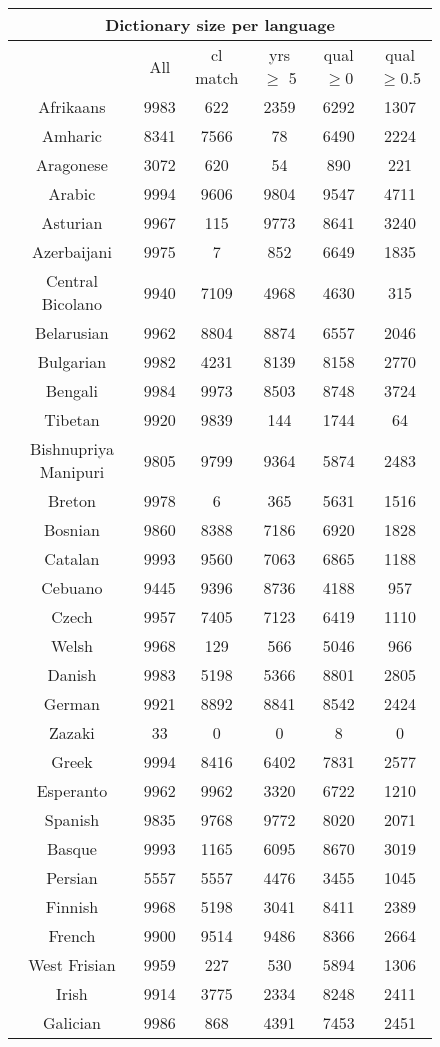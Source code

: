 \begin{figure}[h]
\centering
\begin{tabular}{cccccc}
\multicolumn{6}{c}{Dictionary size per language}\\
\hline\hline
&All&cl match&yrs $\geq$ 5&qual$\geq$0&qual$\geq$0.5\\
\hline\hline
Afrikaans&9983&622&2359&6292&1307\\
Amharic&8341&7566&78&6490&2224\\
Aragonese&3072&620&54&890&221\\
Arabic&9994&9606&9804&9547&4711\\
Asturian&9967&115&9773&8641&3240\\
Azerbaijani&9975&7&852&6649&1835\\
Central Bicolano&9940&7109&4968&4630&315\\
Belarusian&9962&8804&8874&6557&2046\\
Bulgarian&9982&4231&8139&8158&2770\\
Bengali&9984&9973&8503&8748&3724\\
Tibetan&9920&9839&144&1744&64\\
Bishnupriya Manipuri&9805&9799&9364&5874&2483\\
Breton&9978&6&365&5631&1516\\
Bosnian&9860&8388&7186&6920&1828\\
Catalan&9993&9560&7063&6865&1188\\
Cebuano&9445&9396&8736&4188&957\\
Czech&9957&7405&7123&6419&1110\\
Welsh&9968&129&566&5046&966\\
Danish&9983&5198&5366&8801&2805\\
German&9921&8892&8841&8542&2424\\
Zazaki&33&0&0&8&0\\
Greek&9994&8416&6402&7831&2577\\
Esperanto&9962&9962&3320&6722&1210\\
Spanish&9835&9768&9772&8020&2071\\
Basque&9993&1165&6095&8670&3019\\
Persian&5557&5557&4476&3455&1045\\
Finnish&9968&5198&3041&8411&2389\\
French&9900&9514&9486&8366&2664\\
West Frisian&9959&227&530&5894&1306\\
Irish&9914&3775&2334&8248&2411\\
Galician&9986&868&4391&7453&2451\\

\end{tabular}
\end{figure}
